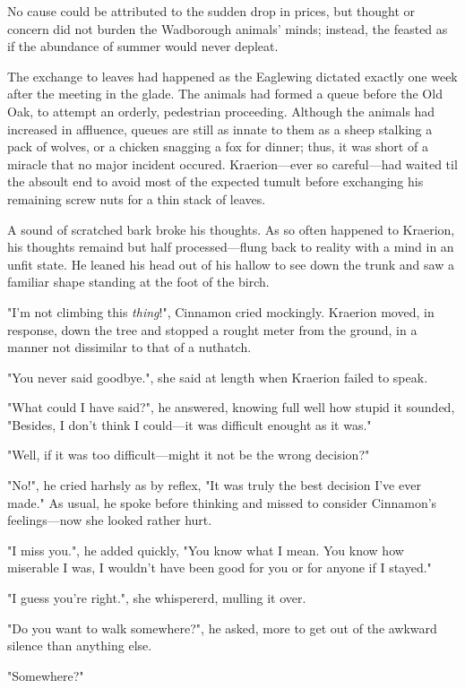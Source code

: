 No cause could be attributed to the sudden drop in prices, but thought or concern did not burden the Wadborough animals' minds; instead, the feasted as if the abundance of summer would never depleat. %

The exchange to leaves had happened as the Eaglewing dictated exactly one week after the meeting in the glade. The animals had formed a queue before the Old Oak, to attempt an orderly, pedestrian proceeding. Although the animals had increased in affluence, queues are still as innate to them as a sheep stalking a pack of wolves, or a chicken snagging a fox for dinner; thus, it was short of a miracle that no major incident occured. Kraerion---ever so careful---had waited til the absoult end to avoid most of the expected tumult before exchanging his remaining screw nuts for a thin stack of leaves.

A sound of scratched bark broke his thoughts. As so often happened to Kraerion, his thoughts remaind but half processed---flung back to reality with a mind in an unfit state. He leaned his head out of his hallow to see down the trunk and saw a familiar shape standing at the foot of the birch.

"I'm not climbing this \textit{thing}!", Cinnamon cried mockingly. Kraerion moved, in response, down the tree and stopped a rought meter from the ground, in a manner not dissimilar to that of a nuthatch.

"You never said goodbye.", she said at length when Kraerion failed to speak.

"What could I have said?", he answered, knowing full well how stupid it sounded, "Besides, I don't think I could---it was difficult enought as it was."

"Well, if it was too difficult---might it not be the wrong decision?"

"No!", he cried harhsly as by reflex, "It was truly the best decision I've ever made."
As usual, he spoke before thinking and missed to consider Cinnamon's feelings---now she looked rather hurt. 

"I miss you.", he added quickly, "You know what I mean. You know how miserable I was, I wouldn't have been good for you or for anyone if I stayed."

"I guess you're right.", she whispererd, mulling it over.

"Do you want to walk somewhere?", he asked, more to get out of the awkward silence than anything else.

"Somewhere?"

